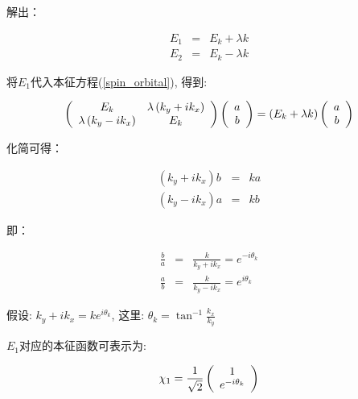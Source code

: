 \begin{enumerate}
解出：

\begin{eqnarray*}
  E_1 &=& E_k + \lambda k \\
  E_2 &=& E_k - \lambda k
\end{eqnarray*}

将$E_1$代入本征方程(\ref{spin_orbital}), 得到:

\begin{equation*}
\left( {\begin{array}{*{20}c}
   { E_k } & { \lambda \left( k_y + i k_x \right)  }  \\
   { \lambda \left( k_y - i k_x  \right) } & { E_k }  \\
 \end{array} } \right)
\left( {\begin{array}{*{20}c}
   {a }  \\
   {b }  \\
 \end{array} } \right)
= \left( E_k + \lambda k \right) \left( {\begin{array}{*{20}c}
   {a }  \\
   {b }  \\
 \end{array} } \right)
\end{equation*}

化简可得：

\begin{eqnarray*}
  \left( k_y + i k_x \right) b &=& k a \\
  \left( k_y - i k_x \right) a &=& k b
\end{eqnarray*}

即：

\begin{eqnarray*}
  \frac{b}{a} &=& \frac{k}{k_y + i k_x} = e^{- i \theta_k} \\
  \frac{a}{b} &=& \frac{k}{k_y - i k_x} = e^{i \theta_k}
\end{eqnarray*}

假设: $k_y + i k_x = k e^{i \theta_k}$, 这里: $\theta_k = \tan^{-1}
\frac{k_x}{k_y}$

$E_1$对应的本征函数可表示为:


\begin{equation*}
\chi_1 =\frac{1}{\sqrt 2} \left( {\begin{array}{*{20}c}
   {1}  \\
   {e^{-i \theta_k}}  \\
 \end{array} } \right)
\end{equation*}


\end{enumerate}
